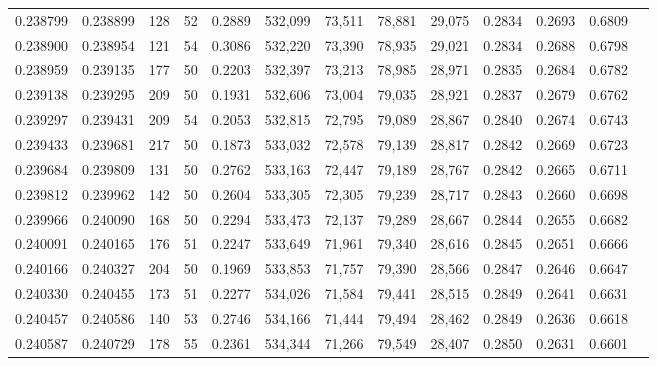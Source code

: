 \begin{tabular}{rrrrrrrrrrrrr}
0.238799 & 0.238899 &   128 &  52 &                                     0.2889 & 532,099 &  73,511 &  78,881 &  29,075 & 0.2834 & 0.2693 & 0.6809 \\
0.238900 & 0.238954 &   121 &  54 &                                     0.3086 & 532,220 &  73,390 &  78,935 &  29,021 & 0.2834 & 0.2688 & 0.6798 \\
0.238959 & 0.239135 &   177 &  50 &                                     0.2203 & 532,397 &  73,213 &  78,985 &  28,971 & 0.2835 & 0.2684 & 0.6782 \\
0.239138 & 0.239295 &   209 &  50 &                                     0.1931 & 532,606 &  73,004 &  79,035 &  28,921 & 0.2837 & 0.2679 & 0.6762 \\
0.239297 & 0.239431 &   209 &  54 &                                     0.2053 & 532,815 &  72,795 &  79,089 &  28,867 & 0.2840 & 0.2674 & 0.6743 \\
0.239433 & 0.239681 &   217 &  50 &                                     0.1873 & 533,032 &  72,578 &  79,139 &  28,817 & 0.2842 & 0.2669 & 0.6723 \\
0.239684 & 0.239809 &   131 &  50 &                                     0.2762 & 533,163 &  72,447 &  79,189 &  28,767 & 0.2842 & 0.2665 & 0.6711 \\
0.239812 & 0.239962 &   142 &  50 &                                     0.2604 & 533,305 &  72,305 &  79,239 &  28,717 & 0.2843 & 0.2660 & 0.6698 \\
0.239966 & 0.240090 &   168 &  50 &                                     0.2294 & 533,473 &  72,137 &  79,289 &  28,667 & 0.2844 & 0.2655 & 0.6682 \\
0.240091 & 0.240165 &   176 &  51 &                                     0.2247 & 533,649 &  71,961 &  79,340 &  28,616 & 0.2845 & 0.2651 & 0.6666 \\
0.240166 & 0.240327 &   204 &  50 &                                     0.1969 & 533,853 &  71,757 &  79,390 &  28,566 & 0.2847 & 0.2646 & 0.6647 \\
0.240330 & 0.240455 &   173 &  51 &                                     0.2277 & 534,026 &  71,584 &  79,441 &  28,515 & 0.2849 & 0.2641 & 0.6631 \\
0.240457 & 0.240586 &   140 &  53 &                                     0.2746 & 534,166 &  71,444 &  79,494 &  28,462 & 0.2849 & 0.2636 & 0.6618 \\
0.240587 & 0.240729 &   178 &  55 &                                     0.2361 & 534,344 &  71,266 &  79,549 &  28,407 & 0.2850 & 0.2631 & 0.6601 \\

\end{tabular}
